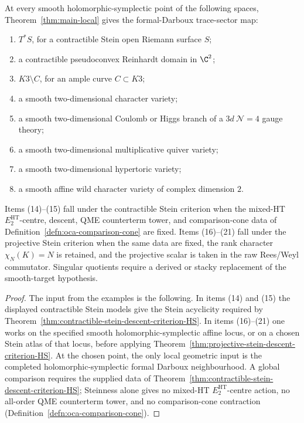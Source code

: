 \begin{cor}
\label{cor:additional-concrete-realizations}
At every smooth holomorphic-symplectic point of the following spaces,
Theorem~\ref{thm:main-local} gives the formal-Darboux trace-sector
map:
\begin{enumerate}[label=\textup{(\arabic*)},start=14]
  \item \(T^*S\), for a contractible Stein open Riemann surface \(S\);
  \item a contractible pseudoconvex Reinhardt domain in \(\C^2\);
  \item \(K3\setminus C\), for an ample curve \(C\subset K3\);
  \item a smooth two-dimensional character variety;
  \item a smooth two-dimensional Coulomb or Higgs branch of a
        \(3d\ \mathcal N=4\) gauge theory;
  \item a smooth two-dimensional multiplicative quiver variety;
  \item a smooth two-dimensional hypertoric variety;
  \item a smooth affine wild character variety of complex dimension
        \(2\).
\end{enumerate}
Items (14)--(15) fall under the contractible Stein criterion when the
mixed-HT \(E_2^{\mathrm{HT}}\)-centre, descent, QME counterterm tower,
and comparison-cone
data of Definition~\ref{defn:oca-comparison-cone} are fixed.
Items (16)--(21) fall under the projective Stein criterion when the
same data are fixed, the rank character \(\chi_N(K)=N\) is retained,
and the projective scalar is taken in the raw Rees/Weyl commutator.
Singular quotients require a derived or stacky replacement of the
smooth-target hypothesis.
\end{cor}

\begin{proof}
The input from the examples is the following.  In items \textup{(14)}
and \textup{(15)} the displayed contractible Stein models give the
Stein acyclicity required by
Theorem~\ref{thm:contractible-stein-descent-criterion-HS}.  In items
\textup{(16)--(21)} one works on the specified smooth
holomorphic-symplectic affine locus, or on a chosen Stein atlas of that
locus, before applying
Theorem~\ref{thm:projective-stein-descent-criterion-HS}.  At the chosen
point, the only local geometric input is the completed
holomorphic-symplectic formal Darboux neighbourhood.  A global comparison
requires the supplied data of
Theorem~\ref{thm:contractible-stein-descent-criterion-HS};
Steinness alone gives no mixed-HT \(E_2^{\mathrm{HT}}\)-centre action, no all-order QME
counterterm tower, and no comparison-cone contraction
(Definition~\ref{defn:oca-comparison-cone}).
\end{proof}

